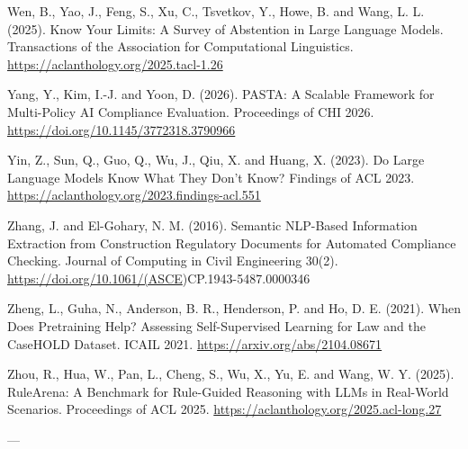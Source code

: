 \documentclass[10pt,twocolumn]{article}
\begin{document}
Wen, B., Yao, J., Feng, S., Xu, C., Tsvetkov, Y., Howe, B. and Wang, L. L. (2025). Know Your Limits: A Survey of Abstention in Large Language Models. Transactions of the Association for Computational Linguistics. \url{https://aclanthology.org/2025.tacl-1.26}

Yang, Y., Kim, I.-J. and Yoon, D. (2026). PASTA: A Scalable Framework for Multi-Policy AI Compliance Evaluation. Proceedings of CHI 2026. \url{https://doi.org/10.1145/3772318.3790966}

Yin, Z., Sun, Q., Guo, Q., Wu, J., Qiu, X. and Huang, X. (2023). Do Large Language Models Know What They Don't Know? Findings of ACL 2023. \url{https://aclanthology.org/2023.findings-acl.551}

Zhang, J. and El-Gohary, N. M. (2016). Semantic NLP-Based Information Extraction from Construction Regulatory Documents for Automated Compliance Checking. Journal of Computing in Civil Engineering 30(2). \url{https://doi.org/10.1061/(ASCE})CP.1943-5487.0000346

Zheng, L., Guha, N., Anderson, B. R., Henderson, P. and Ho, D. E. (2021). When Does Pretraining Help? Assessing Self-Supervised Learning for Law and the CaseHOLD Dataset. ICAIL 2021. \url{https://arxiv.org/abs/2104.08671}

Zhou, R., Hua, W., Pan, L., Cheng, S., Wu, X., Yu, E. and Wang, W. Y. (2025). RuleArena: A Benchmark for Rule-Guided Reasoning with LLMs in Real-World Scenarios. Proceedings of ACL 2025. \url{https://aclanthology.org/2025.acl-long.27}

---

\endgroup

\clearpage
\onecolumn
\appendix
\end{document}
